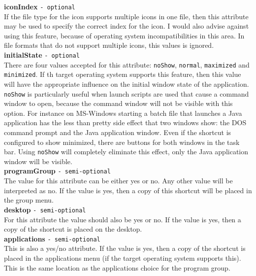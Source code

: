 \textbf{iconIndex} \texttt{- optional}\\

If the file type for the icon supports multiple icons in one file, then
this attribute may be used to specify the correct index for the icon. I
would also advise against using this feature, because of operating
system incompatibilities in this area. In file formats that do not
support multiple icons, this values is ignored.\\

\textbf{initialState} \texttt{- optional}\\

There are four values accepted for this attribute: \texttt{noShow},
\texttt{normal}, \texttt{maximized} and \texttt{minimized}. If th
target operating system supports this feature, then this value will have
the appropriate influence on the initial window state of the
application. \texttt{noShow} is particularly useful when launch scripts
are used that cause a command window to open, because the command window
will not be visible with this option. For instance on MS-Windows
starting a batch file that launches a Java application has the less than
pretty side effect that two windows show: the DOS command prompt and the
Java application window. Even if the shortcut is configured to show
minimized, there are buttons for both windows in the task bar. Using
\texttt{noShow} will completely eliminate this effect, only the Java
application window will be visible.\\

\textbf{programGroup} \texttt{- semi-optional}\\

The value for this attribute can be either yes or no. Any other value
will be interpreted as no. If the value is yes, then a copy of this
shortcut will be placed in the group menu.\\

\textbf{desktop} \texttt{- semi-optional}\\

For this attribute the value should also be yes or no. If the value is
yes, then a copy of the shortcut is placed on the desktop.\\

\textbf{applications} \texttt{- semi-optional}\\

This is also a yes/no attribute. If the value is yes, then a copy of the
shortcut is placed in the applications menu (if the target operating
system supports this). This is the same location as the applications
choice for the program group.\\

